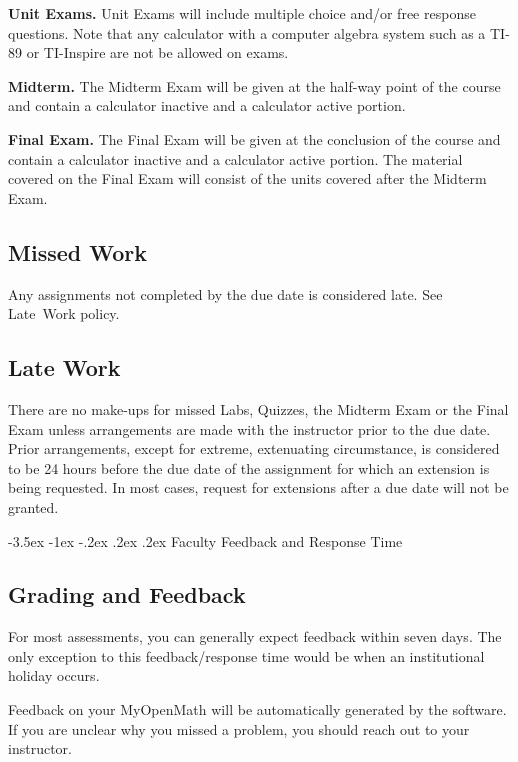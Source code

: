\documentclass{article}
\makeatletter
\renewcommand\section{\@startsection{section}{1}{0pt}%
  {-3.5ex \@plus -1ex \@minus -.2ex}%
  {.2ex \@plus.2ex}%
  {\normalfont\Large\bfseries}} %
\makeatother
\begin{document}
\textbf{Unit Exams.} Unit Exams will include multiple choice and/or free response questions. Note that any calculator with a computer algebra system such as a TI-89 or TI-Inspire are not be allowed on exams.

\textbf{Midterm.} The Midterm Exam will be given at the half-way point of the course and contain a calculator inactive and a calculator active portion.

\textbf{Final Exam.} The Final Exam will be given at the conclusion of the course and contain a calculator inactive and a calculator active portion. The material covered on the Final Exam will consist of the units covered after the Midterm Exam.

\subsection{Missed Work}

Any assignments not completed by the due date is considered late. See Late~Work policy.

\subsection{Late Work}\label{late-work}

There are no make-ups for missed Labs, Quizzes, the Midterm Exam or the Final Exam unless arrangements are made with the instructor prior to the due date. Prior arrangements, except for extreme, extenuating circumstance, is considered to be 24 hours before the due date of the assignment for which an extension is being requested. In most cases, request for extensions after a due date will not be granted.

\section{Faculty Feedback and Response Time}

\subsection{Grading and Feedback}

For most assessments, you can generally expect feedback within seven days. The only exception to this feedback/response time would be when an institutional holiday occurs.

Feedback on your MyOpenMath will be automatically generated by the software. If you are unclear why you missed a problem, you should reach out to your instructor.
\end{document}
